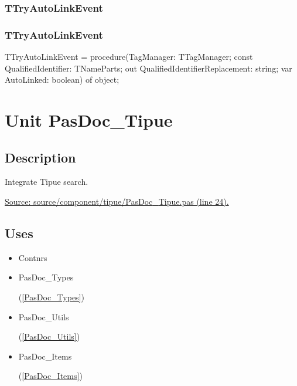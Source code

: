 \documentclass{report}
\newif\ifpdf
\begin{document}
\subsection*{\large{\textbf{TTryAutoLinkEvent}}\normalsize\hspace{1ex}\hrulefill}
\else
\subsection*{TTryAutoLinkEvent}
\fi
\label{PasDoc_TagManager-TTryAutoLinkEvent}
\begin{list}{}{
\setlength{\itemindent}{0cm}
\setlength{\listparindent}{0cm}
\setlength{\leftmargin}{\evensidemargin}
\addtolength{\leftmargin}{\tmplength}
\settowidth{\labelsep}{X}
\addtolength{\leftmargin}{\labelsep}
\setlength{\labelwidth}{\tmplength}
}
\item[\textbf{Declaration}\hfill]
\ifpdf
\begin{flushleft}
\fi
\begin{ttfamily}
TTryAutoLinkEvent = procedure(TagManager: TTagManager; const QualifiedIdentifier: TNameParts; out QualifiedIdentifierReplacement: string; var AutoLinked: boolean) of object;\end{ttfamily}

\ifpdf
\end{flushleft}
\fi

\end{list}
\chapter{Unit PasDoc{\_}Tipue}
\label{PasDoc_Tipue}
\section{Description}
Integrate Tipue search.\par
\href{https://github.com/pasdoc/pasdoc/blob/master/source/component/tipue/PasDoc_Tipue.pas#L24}{Source: source/component/tipue/PasDoc{\_}Tipue.pas (line 24).}
\section{Uses}
\begin{itemize}
\item \begin{ttfamily}Contnrs\end{ttfamily}\item \begin{ttfamily}PasDoc{\_}Types\end{ttfamily}(\ref{PasDoc_Types})\item \begin{ttfamily}PasDoc{\_}Utils\end{ttfamily}(\ref{PasDoc_Utils})\item \begin{ttfamily}PasDoc{\_}Items\end{ttfamily}(\ref{PasDoc_Items})\end{itemize}
\end{document}
